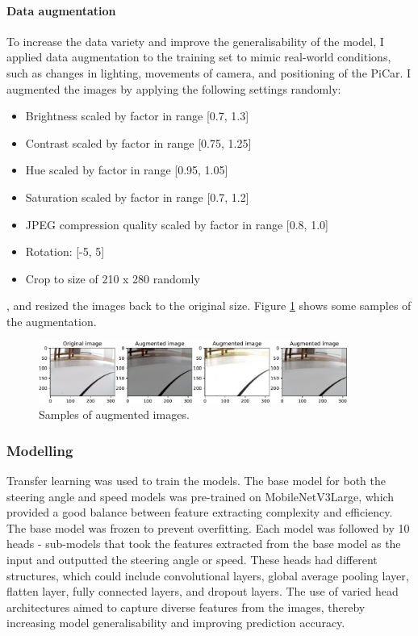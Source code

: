 \documentclass{article}
\begin{document}
\paragraph{Data augmentation}
To increase the data variety and improve the generalisability of the model, I applied data augmentation to the training set to mimic real-world conditions, such as changes in lighting, movements of camera, and positioning of the PiCar. I augmented the images by applying the following settings randomly:
\begin{itemize}
  \item Brightness scaled by factor in range [0.7, 1.3]
  \item Contrast scaled by factor in range [0.75, 1.25]
  \item Hue scaled by factor in range [0.95, 1.05]
  \item Saturation scaled by factor in range [0.7, 1.2]
  \item JPEG compression quality scaled by factor in range [0.8, 1.0]
  \item Rotation: [-5\textdegree, 5\textdegree]
  \item Crop to size of 210 x 280 randomly
\end{itemize}
, and resized the images back to the original size. Figure \ref{fig:augmentation} shows some samples of the augmentation.

\begin{figure}[h]
  \centering
  \includegraphics[width=0.9\textwidth]{figures/augmentation.pdf}
  \caption{Samples of augmented images.}
  \label{fig:augmentation}
\end{figure}

\subsubsection{Modelling}
Transfer learning was used to train the models. The base model for both the steering angle and speed models was pre-trained on MobileNetV3Large, which provided a good balance between feature extracting complexity and efficiency. The base model was frozen to prevent overfitting. Each model was followed by 10 heads - sub-models that took the features extracted from the base model as the input and outputted the steering angle or speed. These heads had different structures, which could include convolutional layers, global average pooling layer, flatten layer, fully connected layers, and dropout layers. The use of varied head architectures aimed to capture diverse features from the images, thereby increasing model generalisability and improving prediction accuracy.
\end{document}
